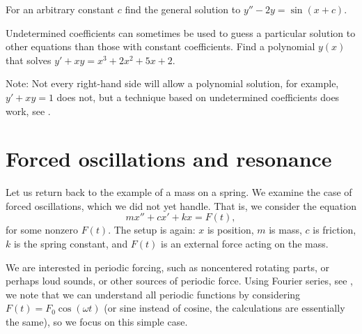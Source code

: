 \begin{exercise}
For an arbitrary constant $c$ find the general solution
to $y''-2y=\sin(x+c)$.
\end{exercise}

\begin{exercise}
Undetermined coefficients can sometimes be used to guess a particular solution
to other equations than those with constant coefficients.
Find a polynomial $y(x)$ that solves 
$y'+ x y = x^3+2x^2+5x+2$.

Note: 
Not every right-hand side will allow a polynomial solution,
for example, $y'+xy=1$ does not, but a technique based on undetermined
coefficients does work, see .
\end{exercise}




\sectionnewpage
\section{Forced oscillations and resonance} \label{forcedo:section}



\begin{mywrapfigsimp}{2.0in}{2.3in}
\noindent
{}
\end{mywrapfigsimp}
Let us return back to the example of a mass on a spring.  We examine
the case of forced oscillations, which we did not yet handle.  That is, we consider the equation
\begin{equation*}
mx'' + cx' + kx = F(t) ,
\end{equation*}
for some nonzero $F(t)$.  The setup
is again: $x$ is position, $m$ is mass, $c$ is friction, $k$ is the spring constant, and
$F(t)$ is an external force acting on the mass.

We are interested in periodic
forcing, such as noncentered rotating parts, or perhaps loud sounds, or
other sources of periodic force.  Using Fourier series, see
, we
note that we can understand all periodic functions
by considering $F(t) = F_0 \cos (\omega t)$ (or sine instead of cosine,
the calculations are essentially the same), so we focus on this simple case.

